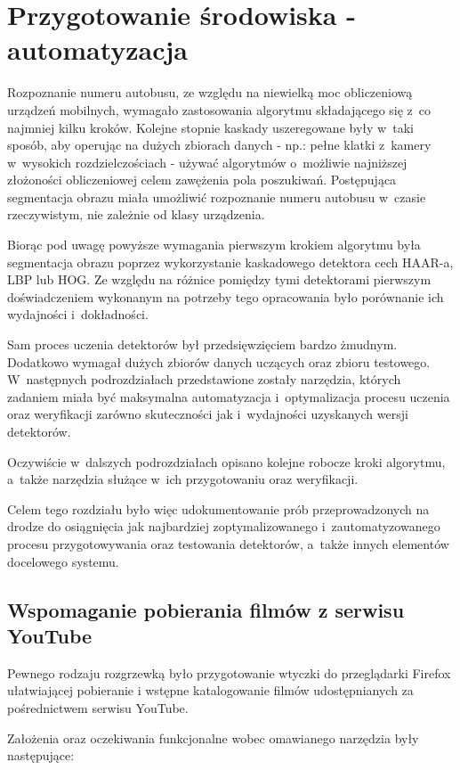 \chapter{Przygotowanie środowiska - automatyzacja}

Rozpoznanie numeru autobusu, ze względu na niewielką moc obliczeniową
urządzeń mobilnych, wymagało zastosowania algorytmu składającego się
z~co najmniej kilku kroków. Kolejne stopnie kaskady uszeregowane były
w~taki sposób, aby operując na dużych zbiorach danych - np.: pełne 
klatki z~kamery w~wysokich rozdzielczościach - używać algorytmów o~możliwie
najniższej złożoności obliczeniowej celem zawężenia pola poszukiwań.
Postępująca segmentacja obrazu miała umożliwić rozpoznanie
numeru autobusu w~czasie rzeczywistym, nie zależnie od klasy urządzenia.

Biorąc pod uwagę powyższe wymagania pierwszym krokiem
algorytmu była segmentacja obrazu poprzez wykorzystanie kaskadowego
detektora cech HAAR-a, LBP lub HOG.
Ze względu na różnice pomiędzy tymi detektorami pierwszym
doświadczeniem wykonanym na potrzeby tego opracowania było porównanie
ich wydajności i~dokładności. 

Sam proces uczenia detektorów był przedsięwzięciem bardzo żmudnym.
Dodatkowo wymagał dużych zbiorów danych uczących oraz zbioru testowego.
W~następnych podrozdziałach przedstawione zostały narzędzia, których
zadaniem miała być maksymalna automatyzacja i~optymalizacja procesu uczenia
oraz weryfikacji zarówno skuteczności jak i~wydajności uzyskanych wersji
detektorów.

Oczywiście w~dalszych podrozdziałach opisano kolejne robocze
kroki algorytmu, a~także narzędzia służące w~ich przygotowaniu oraz 
weryfikacji.

Celem tego rozdziału było więc udokumentowanie prób przeprowadzonych
na drodze do osiągnięcia jak najbardziej zoptymalizowanego 
i~zautomatyzowanego procesu przygotowywania oraz testowania detektorów,
a~także innych elementów docelowego systemu.

\section{Wspomaganie pobierania filmów z serwisu YouTube}

Pewnego rodzaju rozgrzewką było przygotowanie wtyczki do przeglądarki 
Firefox ułatwiającej pobieranie i wstępne katalogowanie filmów
udostępnianych za pośrednictwem serwisu YouTube.

Założenia oraz oczekiwania funkcjonalne wobec omawianego narzędzia były 
następujące:

